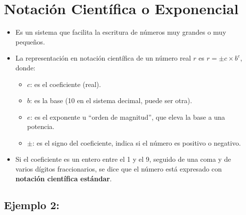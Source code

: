 \documentclass[openany]{book}
\providecommand{\tightlist}{%
  \setlength{\itemsep}{0pt}\setlength{\parskip}{0pt}}
\begin{document}
\hypertarget{notaciuxf3n-cientuxedfica-o-exponencial}{%
\section{Notación Científica o Exponencial}\label{notaciuxf3n-cientuxedfica-o-exponencial}}

\begin{itemize}
\item
  Es un sistema que facilita la escritura de números muy grandes o muy pequeños.
\item
  La representación en notación científica de un número real \(r\) es \(r = \pm c \times b^{e}\), donde:

  \begin{itemize}
  \tightlist
  \item
    \(c\): es el coeficiente (real).
  \item
    \(b\): es la base (10 en el sistema decimal, puede ser otra).
  \item
    \(e\): es el exponente u ``orden de magnitud'', que eleva la base a una potencia.
  \item
    \(\pm\): es el signo del coeficiente, indica si el número es positivo o negativo.
  \end{itemize}
\item
  Si el coeficiente es un entero entre el 1 y el 9, seguido de una coma y de varios dígitos fraccionarios, se dice que el número está expresado con \textbf{notación científica estándar}.
\end{itemize}

\hypertarget{ejemplo-2}{%
\subsection{Ejemplo 2:}\label{ejemplo-2}}
\end{document}
